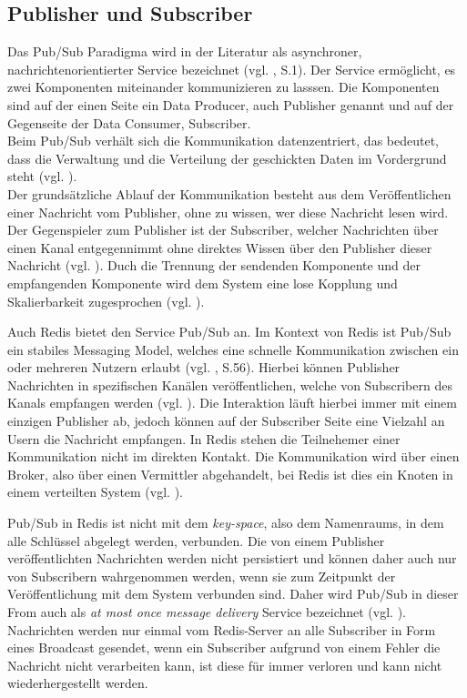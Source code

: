 
\subsection{Publisher und Subscriber}
\label{subsec:pubsub}

Das \ac{Pub/Sub} Paradigma wird in der Literatur als asynchroner, nachrichtenorientierter Service bezeichnet (vgl. \cite{XinZhang}, S.1). Der Service ermöglicht, es zwei Komponenten miteinander kommunizieren zu lasssen. Die Komponenten sind auf der einen Seite ein Data Producer, auch Publisher genannt und auf der Gegenseite der Data Consumer, Subscriber.
\\Beim \acs{Pub/Sub} verhält sich die Kommunikation datenzentriert, das bedeutet, dass die Verwaltung und die Verteilung der geschickten Daten im Vordergrund steht (vgl. \cite{Salehi2018}).
\\Der grundsätzliche Ablauf der Kommunikation besteht aus dem Veröffentlichen einer Nachricht vom Publisher, ohne zu wissen, wer diese Nachricht lesen wird. Der Gegenspieler zum Publisher ist der Subscriber, welcher Nachrichten über einen Kanal entgegennimmt ohne direktes Wissen über den Publisher dieser Nachricht (vgl. \cite{Salehi2018}).
Duch die Trennung der sendenden Komponente und der empfangenden Komponente wird dem System eine lose Kopplung und Skalierbarkeit zugesprochen (vgl. \cite{Salehi2018}).

Auch \acs{Redis} bietet den Service \acs{Pub/Sub} an. Im Kontext von \acs{Redis} ist \acs{Pub/Sub} ein stabiles Messaging Model, welches eine schnelle Kommunikation zwischen ein oder mehreren Nutzern erlaubt (vgl. \cite{Nelson2016}, S.56).
Hierbei können Publisher Nachrichten in spezifischen Kanälen veröffentlichen, welche von Subscribern des Kanals empfangen werden (vgl. \cite{Redis-PubSub}). Die Interaktion läuft hierbei immer mit einem einzigen Publisher ab, jedoch können auf der Subscriber Seite eine Vielzahl an Usern die Nachricht empfangen.
In \acs{Redis} stehen die Teilnehemer einer Kommunikation nicht im direkten Kontakt. Die Kommunikation wird über einen Broker, also über einen Vermittler abgehandelt, bei \acs{Redis} ist dies ein Knoten in einem verteilten System (vgl. \cite{Redis-PubSub}).

\acs{Pub/Sub} in \acs{Redis} ist nicht mit dem \textit{key-space}, also dem Namenraums, in dem alle Schlüssel abgelegt werden, verbunden. Die von einem Publisher veröffentlichten Nachrichten werden nicht persistiert und können daher auch nur von Subscribern wahrgenommen werden, wenn sie zum Zeitpunkt der Veröffentlichung mit dem System verbunden sind. 
Daher wird \acs{Pub/Sub} in dieser From auch als \textit{at most once message delivery} Service bezeichnet (vgl. \cite{Redis-PubSub}). Nachrichten werden nur einmal vom \acs{Redis}-Server an alle Subscriber in Form eines Broadcast gesendet, wenn ein Subscriber aufgrund von einem Fehler die Nachricht nicht verarbeiten kann, ist diese für immer verloren und kann nicht wiederhergestellt werden. 

